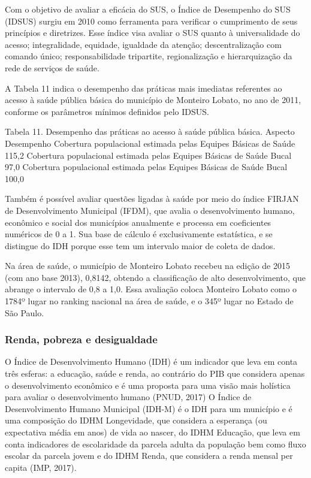 Com o objetivo de avaliar a eficácia do SUS, o Índice de Desempenho do SUS (IDSUS) surgiu em 2010 como ferramenta para verificar o cumprimento de seus princípios e diretrizes. Esse índice visa avaliar o SUS quanto à universalidade do acesso; integralidade, equidade, igualdade da atenção; descentralização com comando único; responsabilidade tripartite, regionalização e hierarquização da rede de serviços de saúde.

A Tabela 11 indica o desempenho das práticas mais imediatas referentes ao acesso à saúde pública básica do município de Monteiro Lobato, no ano de 2011, conforme os parâmetros mínimos definidos pelo IDSUS.

Tabela 11. Desempenho das práticas ao acesso à saúde pública básica.
Aspecto	Desempenho
Cobertura populacional estimada pelas Equipes Básicas de Saúde	115,2%
Cobertura populacional estimada pelas Equipes Básicas de Saúde Bucal	97,0%
Cobertura populacional estimada pelas Equipes Básicas de Saúde Bucal	100,0%

Também é possível avaliar questões ligadas à saúde por meio do índice FIRJAN de Desenvolvimento Municipal (IFDM), que avalia o desenvolvimento humano, econômico e social dos municípios anualmente e processa em coeficientes numéricos de 0 a 1. Sua base de cálculo é exclusivamente estatística, e se distingue do IDH porque esse tem um intervalo maior de coleta de dados. 		

Na área de saúde, o município de Monteiro Lobato recebeu na edição de 2015 (com ano base 2013), 0,8142, obtendo a classificação de alto desenvolvimento, que abrange o intervalo de 0,8 a 1,0. Essa avaliação coloca Monteiro Lobato como o 1784º lugar no ranking nacional na área de saúde, e o 345º lugar no Estado de São Paulo.

\subsubsection{Renda, pobreza e desigualdade}

O Índice de Desenvolvimento Humano (IDH) é um indicador que leva em conta três esferas: a educação, saúde e renda, ao contrário do PIB que considera apenas o desenvolvimento econômico e é uma proposta para uma visão mais holística para avaliar o desenvolvimento humano (PNUD, 2017) O Índice de Desenvolvimento Humano Municipal (IDH-M) é o IDH para um município e é uma composição do IDHM Longevidade, que considera a esperança (ou expectativa média em anos) de vida ao nascer, do IDHM Educação, que leva em conta indicadores de escolaridade da parcela adulta da população bem como fluxo escolar da parcela jovem e do IDHM Renda, que considera a renda mensal per capita (IMP, 2017).

